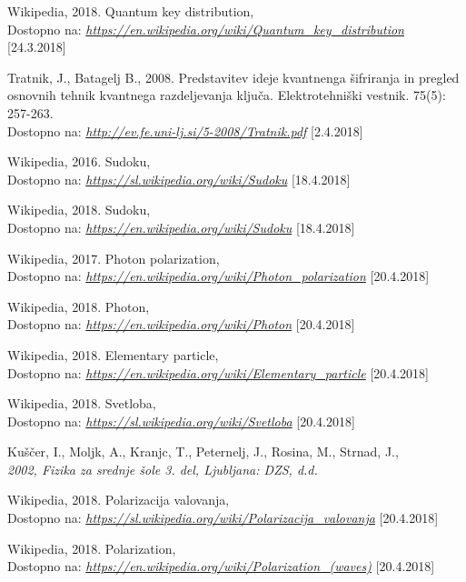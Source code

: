 \documentclass[A4paper, 11pt]{article}
\begin{document}
\begin{thebibliography}{9}
	Wikipedia, 2018. Quantum key distribution,  \\
	Dostopno na:
	\textit{\url{https://en.wikipedia.org/wiki/Quantum_key_distribution}}
	[24.3.2018]

	Tratnik, J., Batagelj B., 2008. Predstavitev ideje kvantnenga šifriranja in pregled osnovnih tehnik kvantnega razdeljevanja ključa. Elektrotehniški vestnik. 75(5): 257-263.\\
	Dostopno na:
	\textit{\url{http://ev.fe.uni-lj.si/5-2008/Tratnik.pdf}}
	[2.4.2018]

	Wikipedia, 2016. Sudoku,  \\
	Dostopno na:
	\textit{\url{https://sl.wikipedia.org/wiki/Sudoku}}
	[18.4.2018]

	Wikipedia, 2018. Sudoku,  \\
	Dostopno na:
	\textit{\url{https://en.wikipedia.org/wiki/Sudoku}}
	[18.4.2018]

	Wikipedia, 2017. Photon polarization,  \\
	Dostopno na:
	\textit{\url{https://en.wikipedia.org/wiki/Photon_polarization}}
	[20.4.2018]

	Wikipedia, 2018. Photon,  \\
	Dostopno na:
	\textit{\url{https://en.wikipedia.org/wiki/Photon}}
	[20.4.2018]

	Wikipedia, 2018. Elementary particle,  \\
	Dostopno na:
	\textit{\url{https://en.wikipedia.org/wiki/Elementary_particle}}
	[20.4.2018]

	Wikipedia, 2018. Svetloba,  \\
	Dostopno na:
	\textit{\url{https://sl.wikipedia.org/wiki/Svetloba}}
	[20.4.2018]

	Kuščer, I., Moljk, A., Kranjc, T., Peternelj, J., Rosina, M., Strnad, J.,  \\
	\textit{2002, Fizika za srednje šole 3. del, Ljubljana: DZS, d.d.}

	Wikipedia, 2018. Polarizacija valovanja,  \\
	Dostopno na:
	\textit{\url{https://sl.wikipedia.org/wiki/Polarizacija_valovanja}}
	[20.4.2018]

	Wikipedia, 2018. Polarization,  \\
	Dostopno na:
	\textit{\url{https://en.wikipedia.org/wiki/Polarization_(waves)}}
	[20.4.2018]


\end{thebibliography}
\end{document}
